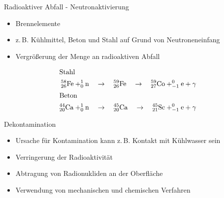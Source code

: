 \begin{frame}{Radioaktiver Abfall - Neutronaktivierung}

      \begin{itemize}
        \setlength\itemsep{1.2em}
        \item{Brennelemente}
        \item{z.\,B. Kühlmittel, Beton und Stahl auf Grund von Neutroneneinfang}
        \item{ Vergrößerung der Menge an radioaktiven Abfall}
      \end{itemize}

    \begin{align*}
        \shortintertext{Stahl}
        ^{58}_{26}\ce{Fe}+ ^1_0\mathrm{n }\quad &\rightarrow \quad  ^{59}_{26}\ce{Fe} \quad \rightarrow \quad ^{59}_{27}\ce{Co} + _{-1}^{0}\ce{e}+\gamma \\
      \shortintertext{Beton}
          ^{44}_{20}\ce{Ca}+ ^1_0\mathrm{n }\quad &\rightarrow \quad  ^{45}_{20}\ce{Ca} \quad \rightarrow \quad ^{45}_{21}\ce{Sc} + _{-1}^{0}\ce{e}+\gamma
    \end{align*}

\end{frame}



\begin{frame}{Dekontamination}
  \begin{itemize}
    \setlength\itemsep{1.2em}
     \item{ Ursache für Kontamination kann z.\,B. Kontakt mit Kühlwasser sein}
    \item{ Verringerung der Radioaktivität}
    \item{ Abtragung von Radionukliden an der Oberfläche}
    \item{ Verwendung von mechanischen und chemischen Verfahren}
  \end{itemize}
\end{frame}


